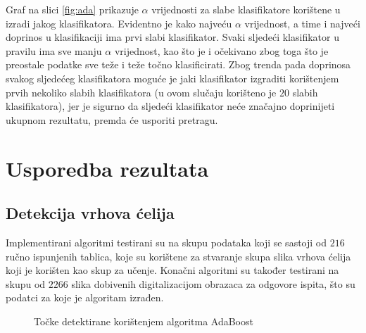 \documentclass[times, utf8, zavrsni, numeric]{fer}
\begin{document}
Graf na slici \ref{fig:ada} prikazuje $\alpha$ vrijednosti za slabe klasifikatore korištene u izradi jakog klasifikatora. 
Evidentno je kako najveću $\alpha$ vrijednost, a time i najveći doprinos u klasifikaciji ima prvi slabi klasifikator. 
Svaki sljedeći klasifikator u pravilu ima sve manju $\alpha$ vrijednost, kao što je i očekivano zbog toga što je preostale podatke sve teže i teže točno klasificirati. 
Zbog trenda pada doprinosa svakog sljedećeg klasifikatora moguće je jaki klasifikator izgraditi korištenjem prvih nekoliko slabih klasifikatora (u ovom slučaju korišteno je $20$ slabih klasifikatora), jer je sigurno da sljedeći klasifikator neće značajno doprinijeti ukupnom rezultatu, premda će usporiti pretragu.

\section{Usporedba rezultata}

\subsection{Detekcija vrhova ćelija}
Implementirani algoritmi testirani su na skupu podataka koji se sastoji od $216$ ručno ispunjenih tablica, koje su korištene za stvaranje skupa slika vrhova ćelija koji je korišten kao skup za učenje.
Konačni algoritmi su također testirani na skupu od $2266$ slika dobivenih digitalizacijom obrazaca za odgovore ispita, što su podatci za koje je algoritam izrađen.

\begin{figure}[!ht]
    \centering
    \captionsetup{justification=centering}
    \caption{Točke detektirane korištenjem algoritma AdaBoost}
    \label{fig:adaResult}
\end{figure}
\end{document}
